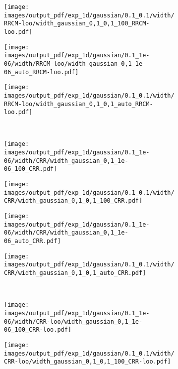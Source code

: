 \documentclass[a4paper,14pt]{extarticle}
\begin{document}
\begin{figure}
  \begin{subfigure}[b]{0.25\linewidth}
    \texttt{[image: images/output\_pdf/exp\_1d/gaussian/0.1\_0.1/width/RRCM-loo/width\_gaussian\_0,1\_0,1\_100\_RRCM-loo.pdf]}
  \end{subfigure}%
  \begin{subfigure}[b]{0.25\linewidth}
    \texttt{[image: images/output\_pdf/exp\_1d/gaussian/0.1\_1e-06/width/RRCM-loo/width\_gaussian\_0,1\_1e-06\_auto\_RRCM-loo.pdf]}
  \end{subfigure}%
  \begin{subfigure}[b]{0.25\linewidth}
    \texttt{[image: images/output\_pdf/exp\_1d/gaussian/0.1\_0.1/width/RRCM-loo/width\_gaussian\_0,1\_0,1\_auto\_RRCM-loo.pdf]}
  \end{subfigure}\\
  \begin{subfigure}[b]{0.25\linewidth}
    \texttt{[image: images/output\_pdf/exp\_1d/gaussian/0.1\_1e-06/width/CRR/width\_gaussian\_0,1\_1e-06\_100\_CRR.pdf]}
  \end{subfigure}%
  \begin{subfigure}[b]{0.25\linewidth}
    \texttt{[image: images/output\_pdf/exp\_1d/gaussian/0.1\_0.1/width/CRR/width\_gaussian\_0,1\_0,1\_100\_CRR.pdf]}
  \end{subfigure}%
  \begin{subfigure}[b]{0.25\linewidth}
    \texttt{[image: images/output\_pdf/exp\_1d/gaussian/0.1\_1e-06/width/CRR/width\_gaussian\_0,1\_1e-06\_auto\_CRR.pdf]}
  \end{subfigure}%
  \begin{subfigure}[b]{0.25\linewidth}
    \texttt{[image: images/output\_pdf/exp\_1d/gaussian/0.1\_0.1/width/CRR/width\_gaussian\_0,1\_0,1\_auto\_CRR.pdf]}
  \end{subfigure}\\
  \begin{subfigure}[b]{0.25\linewidth}
    \texttt{[image: images/output\_pdf/exp\_1d/gaussian/0.1\_1e-06/width/CRR-loo/width\_gaussian\_0,1\_1e-06\_100\_CRR-loo.pdf]}
    \caption{} \label{fig:gaussian_1d_high_noise_width_c1}
  \end{subfigure}%
  \begin{subfigure}[b]{0.25\linewidth}
    \texttt{[image: images/output\_pdf/exp\_1d/gaussian/0.1\_0.1/width/CRR-loo/width\_gaussian\_0,1\_0,1\_100\_CRR-loo.pdf]}
    \caption{} \label{fig:gaussian_1d_high_noise_width_c2}

\end{subfigure}
\end{figure}
\end{document}
